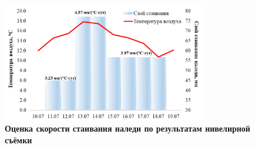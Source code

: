 \begin{figure}[h!]
  \begin{center}
    \includegraphics[width=0.8\textwidth]{authors/zemlaykova-1-fig-2.png}
  \end{center}
  \caption{\textbf{Оценка скорости стаивания наледи по результатам нивелирной съёмки}}
  \label{fig:zemlaykova-1-fig-2}
\end{figure}
